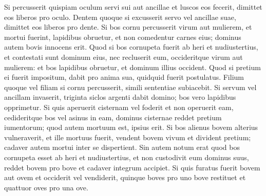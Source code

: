 \begin{biblechapter}
\verse Si percusserit quispiam oculum servi sui aut ancillae et luscos eos fecerit, dimittet eos liberos pro oculo. 
\verse Dentem quoque si excusserit servo vel ancillae suae, dimittet eos liberos pro dente. 
\verse Si bos cornu percusserit virum aut mulierem, et mortui fuerint, lapidibus obruetur, et non comedentur carnes eius; dominus autem bovis innocens erit.  
\verse Quod si bos cornupeta fuerit ab heri et nudiustertius, et contestati sunt dominum eius, nec recluserit eum, occideritque virum aut mulierem: et bos lapidibus obruetur, et dominum illius occident. 
\verse Quod si pretium ei fuerit impositum, dabit pro anima sua, quidquid fuerit postulatus. 
\verse Filium quoque vel filiam si cornu percusserit, simili sententiae subiacebit. 
\verse Si servum vel ancillam invaserit, triginta siclos argenti dabit domino; bos vero lapidibus opprimetur. 
\verse Si quis aperuerit cisternam vel foderit et non operuerit eam, cedideritque bos vel asinus in eam, 
\verse dominus cisternae reddet pretium iumentorum; quod autem mortuum est, ipsius erit. 
\verse Si bos alienus bovem alterius vulneraverit, et ille mortuus fuerit, vendent bovem vivum et divident pretium; cadaver autem mortui inter se dispertient.  
\verse Sin autem notum erat quod bos cornupeta esset ab heri et nudiustertius, et non custodivit eum dominus suus, reddet bovem pro bove et cadaver integrum accipiet. 
\verse Si quis furatus fuerit bovem aut ovem et occiderit vel vendiderit, quinque boves pro uno bove restituet et quattuor oves pro una ove. 
\end{biblechapter}

